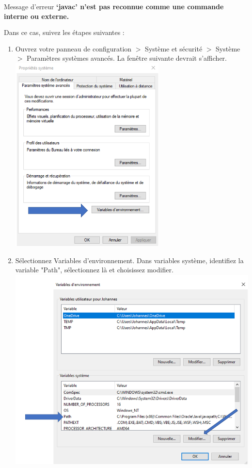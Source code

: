 \begin{Example}{\faExclamationTriangle \quad Message d'erreur}
    \textbf{`javac' n'est pas reconnue comme une commande interne ou externe.}
\end{Example}

Dans ce cas, suivez les étapes suivantes :

\begin{enumerate}
    \item Ouvrez votre panneau de configuration $>$ Système et sécurité $>$ Système $>$ Paramètres systèmes avancés. La fenêtre suivante devrait s'afficher.\\
    \includegraphics[height = 10cm]{img/Res1.PNG}
    \\
    \item Sélectionnez Variables d'environnement. Dans variables système, identifiez la variable "Path", sélectionnez là et choisissez modifier.\\
    \includegraphics[width=16cm]{img/Res2.PNG}

\end{enumerate}
